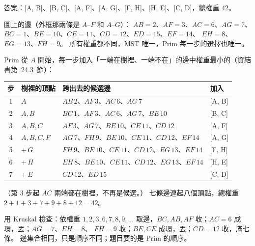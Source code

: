 \begin{pastsoln}
答案：[A, B]、[B, C]、[A, F]、[A, G]、[F, H]、[H, E]、[C, D]，總權重 $42$。

圖上的邊（外框那兩條是 $A$--$F$ 和 $A$--$G$）：
$AB = 2$、$AF = 3$、$AC = 6$、$AG = 7$、$BC = 1$、$BE = 10$、$CE = 11$、$CD = 12$、$ED = 15$、$EF = 14$、
$EH = 8$、$EG = 13$、$FH = 9$。 所有權重都不同，MST 唯一，Prim 每一步的選擇也唯一。

Prim 從 $A$ 開始，每一步加入「一端在樹裡、一端不在」的邊中權重最小的（資結書第~24.3~節）：
\begin{center}
\small
\begin{tabular}{clll}
\toprule
步 & 樹裡的頂點 & 跨出去的候選邊 & 加入 \\
\midrule
1 & $A$ & $AB\,2$、$AF\,3$、$AC\,6$、$AG\,7$ & [A, B] \\
2 & $A, B$ & $BC\,1$、$AF\,3$、$AC\,6$、$AG\,7$、$BE\,10$ & [B, C] \\
3 & $A, B, C$ & $AF\,3$、$AG\,7$、$BE\,10$、$CE\,11$、$CD\,12$ & [A, F] \\
4 & $A, B, C, F$ & $AG\,7$、$FH\,9$、$BE\,10$、$CE\,11$、$CD\,12$、$EF\,14$ & [A, G] \\
5 & $+\,G$ & $FH\,9$、$BE\,10$、$CE\,11$、$CD\,12$、$EG\,13$、$EF\,14$ & [F, H] \\
6 & $+\,H$ & $EH\,8$、$BE\,10$、$CE\,11$、$CD\,12$、$EG\,13$、$EF\,14$ & [H, E] \\
7 & $+\,E$ & $CD\,12$、$ED\,15$ & [C, D] \\
\bottomrule
\end{tabular}
\end{center}
（第 3 步起 $AC$ 兩端都在樹裡，不再是候選。） 七條邊連起八個頂點，總權重
$2 + 1 + 3 + 7 + 9 + 8 + 12 = 42$。

用 Kruskal 檢查：依權重 $1, 2, 3, 6, 7, 8, 9, \ldots$ 取邊，$BC, AB, AF$ 收；$AC = 6$ 成環，丟；$AG = 7$、$EH = 8$、
$FH = 9$ 收；$BE, CE$ 成環，丟；$CD = 12$ 收，滿七條。 邊集合相同，只是順序不同；題目要的是 Prim 的順序。
\end{pastsoln}
